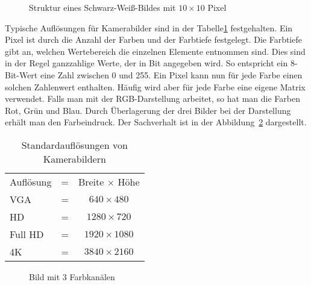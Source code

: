 \begin{figure}
\begin{center}
	\end{center}    
	
	
	\caption{Struktur eines Schwarz-Weiß-Bildes mit $10 \times 10$ Pixel}\label{img:schwarzweiss}
\end{figure}


Typische Auflösungen für Kamerabilder sind in der Tabelle\ref{Bild:Aufloesung} festgehalten. Ein Pixel ist durch die Anzahl der Farben und der Farbtiefe festgelegt. Die Farbtiefe gibt an, welchen Wertebereich die einzelnen Elemente entnommen sind. Dies sind in der Regel ganzzahlige Werte, der in Bit angegeben wird. So entspricht ein 8-Bit-Wert eine Zahl zwischen 0 und 255. Ein Pixel kann nun für jede Farbe einen solchen Zahlenwert enthalten. Häufig wird aber für jede Farbe eine eigene  Matrix verwendet. Falls man mit der RGB-Darstellung arbeitet, so hat man die Farben Rot, Grün und Blau. Durch Überlagerung der drei Bilder bei der Darstellung erhält man den Farbeindruck. Der Sachverhalt ist in der Abbildung~\ref{Bild:lenaRGB} dargestellt. 



\begin{table}
	\centering
	\begin{tabular}{lcc}
		Auflösung       &=& Breite $\times$ Höhe \\
		VGA             &=& $640 \times 480$ \\
		HD              &=& $1280 \times 720$\\
		Full HD         &=& $1920 \times 1080$\\
		4K              &=& $3840 \times 2160$\\
	\end{tabular}
	\caption{Standardauflösungen von Kamerabildern}\label{Bild:Aufloesung}  	
\end{table}

\bigskip



\begin{figure}
	\centering
	\caption{Bild mit 3 Farbkanälen}\label{Bild:lenaRGB}
\end{figure}

